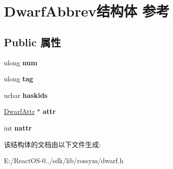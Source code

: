 \hypertarget{struct_dwarf_abbrev}{}\section{Dwarf\+Abbrev结构体 参考}
\label{struct_dwarf_abbrev}
\subsection*{Public 属性}
\begin{DoxyCompactItemize}
\item 
\mbox{\label{struct_dwarf_abbrev_a203f856d0b5ef9dac9c1cadc58921ec2}} 
ulong {\bfseries num}
\item 
\mbox{\label{struct_dwarf_abbrev_a5ca0462f2b2e31493279ff2308212b05}} 
ulong {\bfseries tag}
\item 
\mbox{\label{struct_dwarf_abbrev_a80dc9bb066f45f5c1f320f5006d7f2ec}} 
uchar {\bfseries haskids}
\item 
\mbox{\label{struct_dwarf_abbrev_a9530509a2822fc8af98c0a286b740e7c}} 
\hyperlink{struct_dwarf_attr}{Dwarf\+Attr} $\ast$ {\bfseries attr}
\item 
\mbox{\label{struct_dwarf_abbrev_a10c89b50cc827af93e31385c3d630fbd}} 
int {\bfseries nattr}
\end{DoxyCompactItemize}


该结构体的文档由以下文件生成\+:\begin{DoxyCompactItemize}
\item 
E\+:/\+React\+O\+S-\/0../sdk/lib/rossym/dwarf.\+h\end{DoxyCompactItemize}
